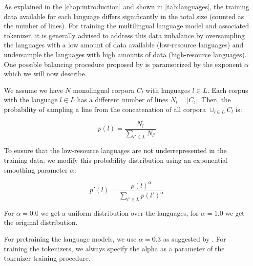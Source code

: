 
As explained in the \autoref{chap:introduction} and shown in \autoref{tab:languages}, the training data available for each language differs significantly in the total size (counted as the number of lines). For training the multilingual language model and associated tokenizer, it is generally advised to address this data imbalance by oversampling the languages with a low amount of data available (low-resource languages) and undersample the languages with high amounts of data (high-resource languages). One possible balancing procedure proposed by \citet{devlin_bert_2019,conneau_unsupervised_2020} is parametrized by the exponent $\alpha$ which we will now describe.

We assume we have $N$ monolingual corpora $C_l$ with languages $l \in L$. Each corpus with the language $l \in L$ has a different number of lines $N_l = |C_l|$. Then, the probability of sampling a line from the concatenation of all corpora $\cup_{l \in L} C_l$ is:

\begin{equation}
    p(l) = \frac{N_l}{\sum_{l' \in L} N_{l'}}
\end{equation}


To ensure that the low-resource languages are not underrepresented in the training data, we modify this probability distribution using an exponential smoothing parameter $\alpha$:

\begin{equation}
    p'(l) = \frac{p(l)^\alpha}{\sum_{l' \in L} p(l')^\alpha}
\end{equation}

For $\alpha = 0.0$ we get a uniform distribution over the languages, for $\alpha = 1.0$ we get the original distribution. 

For pretraining the language models, we use $\alpha = 0.3$ as suggested by \citet{conneau_unsupervised_2020-1}. For training the tokenizers, we always specify the alpha as a parameter of the tokenizer training procedure. 

